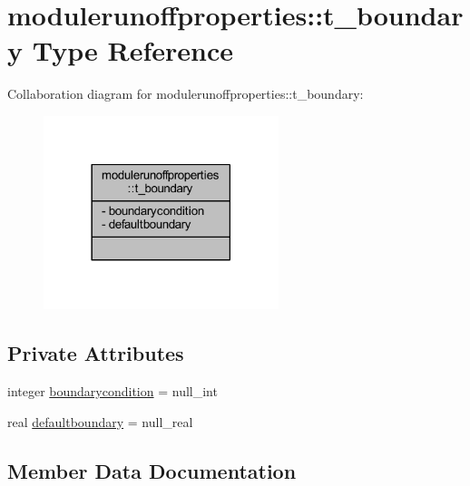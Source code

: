 \hypertarget{structmodulerunoffproperties_1_1t__boundary}{}\section{modulerunoffproperties\+:\+:t\+\_\+boundary Type Reference}
\label{structmodulerunoffproperties_1_1t__boundary}


Collaboration diagram for modulerunoffproperties\+:\+:t\+\_\+boundary\+:\nopagebreak
\begin{figure}[H]
\begin{center}
\leavevmode
\includegraphics[width=194pt]{structmodulerunoffproperties_1_1t__boundary__coll__graph}
\end{center}
\end{figure}
\subsection*{Private Attributes}
\begin{DoxyCompactItemize}
\item 
integer \mbox{\hyperlink{structmodulerunoffproperties_1_1t__boundary_adb31c1c497e0f78157bad081abbb22e6}{boundarycondition}} = null\+\_\+int
\item 
real \mbox{\hyperlink{structmodulerunoffproperties_1_1t__boundary_a512fd7ce237fd1696a73e6ac170a53e7}{defaultboundary}} = null\+\_\+real
\end{DoxyCompactItemize}


\subsection{Member Data Documentation}
\mbox{\label{structmodulerunoffproperties_1_1t__boundary_adb31c1c497e0f78157bad081abbb22e6}} 
